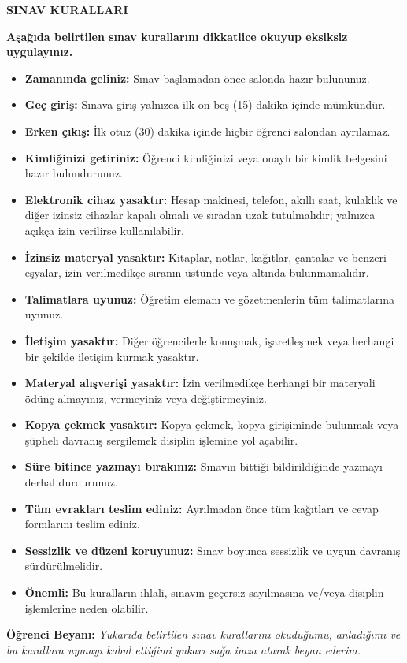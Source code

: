 \documentclass[12pt,a4paper]{exam}
\newlength{\ContentTopOffset}
\begin{document}
\vspace*{\ContentTopOffset}

{\small
\vspace{0.3cm}
\begin{center}
\textbf{SINAV KURALLARI}
\end{center}
\vspace{0.1cm}
\noindent\textbf{Aşağıda belirtilen sınav kurallarını dikkatlice okuyup eksiksiz uygulayınız.}
\vspace{-0.1cm}
\begin{itemize}\setlength{\itemsep}{0pt}\setlength{\parskip}{0pt}\setlength{\parsep}{0pt}
    \item \textbf{Zamanında geliniz:} Sınav başlamadan önce salonda hazır bulununuz.
    \item \textbf{Geç giriş:} Sınava giriş yalnızca ilk on beş (15) dakika içinde mümkündür.
    \item \textbf{Erken çıkış:} İlk otuz (30) dakika içinde hiçbir öğrenci salondan ayrılamaz.
    \item \textbf{Kimliğinizi getiriniz:} Öğrenci kimliğinizi veya onaylı bir kimlik belgesini hazır bulundurunuz.
    \item \textbf{Elektronik cihaz yasaktır:} Hesap makinesi, telefon, akıllı saat, kulaklık ve diğer izinsiz cihazlar kapalı olmalı ve sıradan uzak tutulmalıdır; yalnızca açıkça izin verilirse kullanılabilir.
    \item \textbf{İzinsiz materyal yasaktır:} Kitaplar, notlar, kağıtlar, çantalar ve benzeri eşyalar, izin verilmedikçe sıranın üstünde veya altında bulunmamalıdır.
    \item \textbf{Talimatlara uyunuz:} Öğretim elemanı ve gözetmenlerin tüm talimatlarına uyunuz.
    \item \textbf{İletişim yasaktır:} Diğer öğrencilerle konuşmak, işaretleşmek veya herhangi bir şekilde iletişim kurmak yasaktır.
    \item \textbf{Materyal alışverişi yasaktır:} İzin verilmedikçe herhangi bir materyali ödünç almayınız, vermeyiniz veya değiştirmeyiniz.
    \item \textbf{Kopya çekmek yasaktır:} Kopya çekmek, kopya girişiminde bulunmak veya şüpheli davranış sergilemek disiplin işlemine yol açabilir.
    \item \textbf{Süre bitince yazmayı bırakınız:} Sınavın bittiği bildirildiğinde yazmayı derhal durdurunuz.
    \item \textbf{Tüm evrakları teslim ediniz:} Ayrılmadan önce tüm kağıtları ve cevap formlarını teslim ediniz.
    \item \textbf{Sessizlik ve düzeni koruyunuz:} Sınav boyunca sessizlik ve uygun davranış sürdürülmelidir.
    \item \textbf{Önemli:} Bu kuralların ihlali, sınavın geçersiz sayılmasına ve/veya disiplin işlemlerine neden olabilir.
\end{itemize}

\vspace{0.1cm}
\textbf{Öğrenci Beyanı:} \textit{Yukarıda belirtilen sınav kurallarını okuduğumu, anladığımı ve bu kurallara uymayı kabul ettiğimi  yukarı sağa imza atarak beyan ederim.}
}
\end{document}
